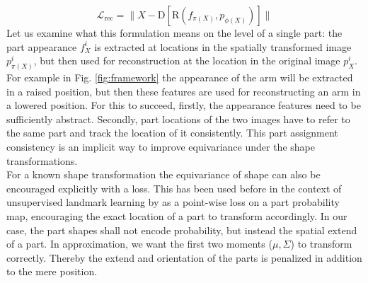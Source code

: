 	\begin{equation}
	\mathcal{L}_{\textrm{rec}}= \lVert  X  - \mathrm{D}[\mathrm{R}(f_{\pi(X)}, p_{\phi(X)})]\rVert
	\end{equation}
	\label{eq:loss_rec}
	Let us examine what this formulation means on the level of a single part: the part appearance $f^i_X$ is extracted at locations in the spatially transformed image $p^i_{\pi(X)}$, but then used for reconstruction at the location in the original image $p^i_{X}$. For example in Fig.  \ref{fig:framework} the appearance of the arm will be extracted in a raised position, but then these features are used for reconstructing an arm in a lowered position. For this to succeed, firstly, the appearance features need to be sufficiently abstract. Secondly, part locations of the two images have to refer to the same part and track the location of it consistently. This part assignment consistency is an implicit way to improve equivariance under the shape transformations.\\
	For a known shape transformation the equivariance of shape can also be encouraged explicitly with a loss. This has been used before in the context of unsupervised landmark learning by \cite{thewlis17, Zhang18} as a point-wise loss on a part probability map, encouraging the exact location of a part to transform accordingly. In our case, the part shapes shall not encode probability, but instead the spatial extend of a part. In approximation, we want the first two moments ($\mu, \Sigma$) to transform correctly. Thereby the extend and orientation of the parts is penalized in addition to the mere position.
